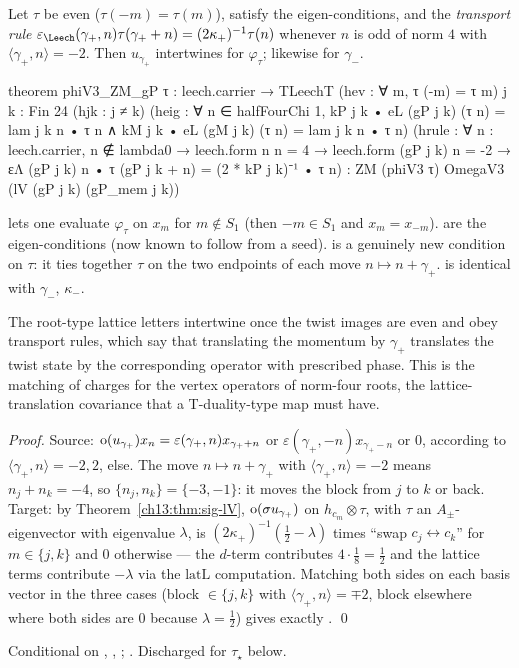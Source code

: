 \begin{theorem}\label{ch13:thm:root-letters}
Let $\tau$ be even ($\tau(-m)=\tau(m)$), satisfy the eigen-conditions, and the \emph{transport rule}
$\varepsilon_\Leech(\gamma_+,n)\tau(\gamma_++n)=(2\kappa_+)^{-1}\tau(n)$ whenever $n$ is odd of norm $4$ with
$\langle\gamma_+,n\rangle=-2$. Then $u_{\gamma_+}$ intertwines for $\varphi_\tau$; likewise for $\gamma_-$.
\end{theorem}
\begin{leancode}
theorem phiV3_ZM_gP {τ : leech.carrier → TLeechT} (hev : ∀ m, τ (-m) = τ m) {j k : Fin 24}
    (hjk : j ≠ k)
    (heig : ∀ n ∈ halfFourChi 1, kP j k • eL (gP j k) (τ n) = lam j k n • τ n ∧
      kM j k • eL (gM j k) (τ n) = lam j k n • τ n)
    (hrule : ∀ n : leech.carrier, n ∉ lambda0 → leech.form n n = 4 → leech.form (gP j k) n = -2 →
      εΛ (gP j k) n • τ (gP j k + n) = (2 * kP j k)⁻¹ • τ n) :
    ZM (phiV3 τ) OmegaV3 (lV (gP j k) (gP_mem j k))
\end{leancode}
\begin{dictionary}
 lets one evaluate $\varphi_\tau$ on $x_m$ for $m\notin S_1$ (then $-m\in S_1$ and $x_m=x_{-m}$). 
are the eigen-conditions (now known to follow from a seed).  is a genuinely new condition
on $\tau$: it ties together $\tau$ on the two endpoints of each move $n\mapsto n+\gamma_+$.  is
identical with $\gamma_-$, $\kappa_-$.
\end{dictionary}
\begin{physics}
The root-type lattice letters intertwine once the twist images are even and obey transport rules, which say that translating the momentum by $\gamma_+$ translates the twist state by the corresponding operator with prescribed phase. This is the matching of charges for the vertex operators of norm-four roots, the lattice-translation covariance that a T-duality-type map must have.
\end{physics}
\noindent\emph{Proof.} Source: $\operatorname{o}(u_{\gamma_+})x_n=\varepsilon(\gamma_+,n)x_{\gamma_++n}$ or
$\varepsilon(\gamma_+,-n)x_{\gamma_+-n}$ or $0$, according to $\langle\gamma_+,n\rangle=-2,2$, else. The move $n\mapsto n+\gamma_+$ with
$\langle\gamma_+,n\rangle=-2$ means $n_j+n_k=-4$, so $\{n_j,n_k\}=\{-3,-1\}$: it moves the block from $j$ to $k$ or back.
Target: by Theorem~\ref{ch13:thm:sig-lV}, $\operatorname{o}(\sigma u_{\gamma_+})$ on $h_{c_m}\otimes\tau$, with $\tau$ an
$A_\pm$-eigenvector with eigenvalue $\lambda$, is $(2\kappa_+)^{-1}(\tfrac12-\lambda)$ times ``swap $c_j\leftrightarrow c_k$''
for $m\in\{j,k\}$ and $0$ otherwise --- the $d$-term contributes $4\cdot\tfrac18=\tfrac12$ and the lattice terms
contribute $-\lambda$ via the $\mathrm{latL}$ computation. Matching both sides on each basis vector in the three
cases (block $\in\{j,k\}$ with $\langle\gamma_+,n\rangle=\mp2$, block elsewhere where both sides are $0$ because
$\lambda=\tfrac12$) gives exactly . \qed
\begin{status}Conditional on , , ; .
Discharged for $\tau_\star$ below.\end{status}

